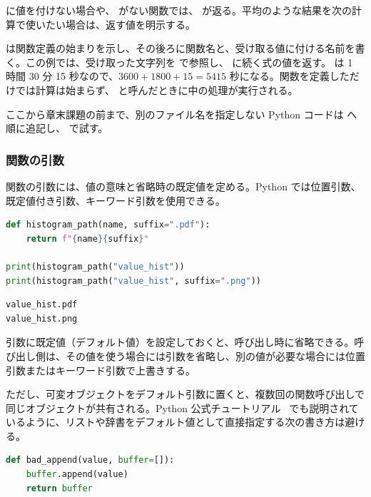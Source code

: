  に値を付けない場合や、 がない関数では、 が返る。平均のような結果を次の計算で使いたい場合は、返す値を明示する。

 は関数定義の始まりを示し、その後ろに関数名と、受け取る値に付ける名前を書く。この例では、受け取った文字列を  で参照し、 に続く式の値を返す。 は 1 時間 30 分 15 秒なので、\(3600+1800+15=5415\) 秒になる。関数を定義しただけでは計算は始まらず、 と呼んだときに中の処理が実行される。

ここから章末課題の前まで、別のファイル名を指定しない Python コードは  へ順に追記し、 で試す。

\subsubsection{関数の引数}

関数の引数には、値の意味と省略時の既定値を定める。Python では位置引数、既定値付き引数、キーワード引数を使用できる。

\begin{lstlisting}[language=Python]
def histogram_path(name, suffix=".pdf"):
    return f"{name}{suffix}"

print(histogram_path("value_hist"))
print(histogram_path("value_hist", suffix=".png"))
\end{lstlisting}
\begin{lstlisting}[numbers=none, xleftmargin=2\zw]
value_hist.pdf
value_hist.png
\end{lstlisting}

引数に既定値（デフォルト値）を設定しておくと、呼び出し時に省略できる。呼び出し側は、その値を使う場合には引数を省略し、別の値が必要な場合には位置引数またはキーワード引数で上書きする。

ただし、可変オブジェクトをデフォルト引数に置くと、複数回の関数呼び出しで同じオブジェクトが共有される。Python 公式チュートリアル~\cite{python_tutorial} でも説明されているように、リストや辞書をデフォルト値として直接指定する次の書き方は避ける。

\begin{lstlisting}[language=Python]
def bad_append(value, buffer=[]):
    buffer.append(value)
    return buffer
\end{lstlisting}

